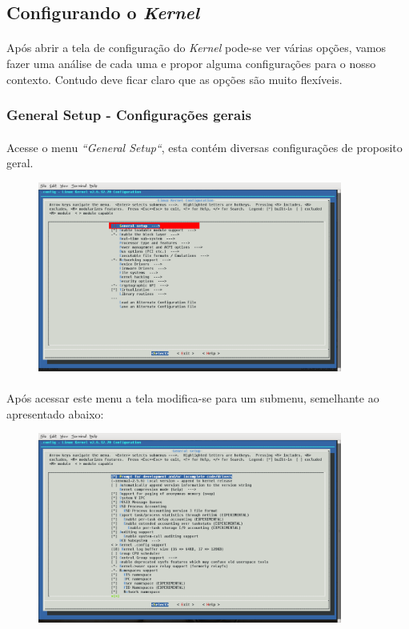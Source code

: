 \documentclass[a4paper,10pt]{article}
\begin{document}
  \subsection{Configurando o \emph{Kernel}}
    \paragraph{}
    Após abrir a tela de configuração do \emph{Kernel} pode-se ver várias opções, vamos fazer uma análise de cada uma e propor 
    alguma configurações para o nosso contexto. Contudo deve ficar claro que as opções são muito flexíveis.

  \newpage
  \subsubsection{General Setup - Configurações gerais}
    \paragraph{}
    Acesse o menu \emph{``General Setup``}, esta contém diversas configurações de proposito geral.
      \begin{figure}[ht]
	\center
	\includegraphics[width=10cm]{images/GeneralSetupInit.png}
      \end{figure}

    \paragraph{}
    Após acessar este menu a tela modifica-se para um submenu, semelhante ao apresentado abaixo:
      \begin{figure}[ht]
	\center
	\includegraphics[width=10cm]{images/GeneralSetup1.png}
      \end{figure}
\end{document}
